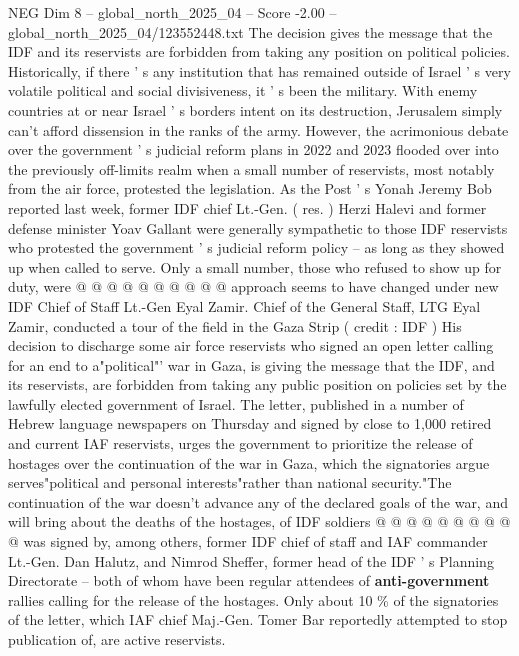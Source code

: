 \begin{textsample}{NEG Dim 8 – global\_north\_2025\_04 – Score -2.00 – global\_north\_2025\_04/123552448.txt}  \label{ex:f8_neg_418}
The decision gives the message that the IDF and its reservists are forbidden from taking any position on political policies.
Historically, if there ' s any institution that has remained outside of Israel ' s very volatile political and social divisiveness, it ' s been the military.
With enemy countries at or near Israel ' s borders intent on its destruction, Jerusalem simply can't afford dissension in the ranks of the army.
However, the acrimonious debate over the government ' s judicial reform plans in 2022 and 2023 flooded over into the previously off-limits realm when a small number of reservists, most notably from the air force, protested the legislation.
As the Post ' s Yonah Jeremy Bob reported last week, former IDF chief Lt.-Gen. ( res. ) Herzi Halevi and former defense minister Yoav Gallant were generally sympathetic to those IDF reservists who protested the government ' s judicial reform policy -- as long as they showed up when called to serve.
Only a small number, those who refused to show up for duty, were @ @ @ @ @ @ @ @ @ @ approach seems to have changed under new IDF Chief of Staff Lt.-Gen Eyal Zamir.
Chief of the General Staff, LTG Eyal Zamir, conducted a tour of the field in the Gaza Strip ( credit : IDF ) His decision to discharge some air force reservists who signed an open letter calling for an end to a"political"' war in Gaza, is giving the message that the IDF, and its reservists, are forbidden from taking any public position on policies set by the lawfully elected government of Israel.
The letter, published in a number of Hebrew language newspapers on Thursday and signed by close to 1,000 retired and current IAF reservists, urges the government to prioritize the release of hostages over the continuation of the war in Gaza, which the signatories argue serves"political and personal interests"rather than national security."The continuation of the war doesn't advance any of the declared goals of the war, and will bring about the deaths of the hostages, of IDF soldiers @ @ @ @ @ @ @ @ @ @ was signed by, among others, former IDF chief of staff and IAF commander Lt.-Gen.
Dan Halutz, and Nimrod Sheffer, former head of the IDF ' s Planning Directorate -- both of whom have been regular attendees of \textbf{anti-government} rallies calling for the release of the hostages.
Only about 10 \% of the signatories of the letter, which IAF chief Maj.-Gen.
Tomer Bar reportedly attempted to stop publication of, are active reservists.

\end{textsample}
